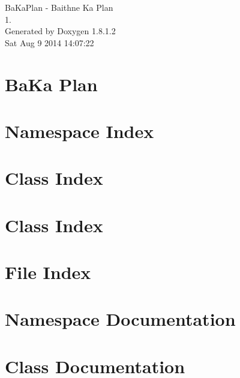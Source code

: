 \documentclass{book}
\begin{document}
\hypersetup{pageanchor=false,citecolor=blue}
\begin{titlepage}
\vspace*{7cm}
\begin{center}
{\Large Ba\-Ka\-Plan -\/ Baithne Ka Plan \\[1ex]\large 1. }\\
\vspace*{1cm}
{\large Generated by Doxygen 1.8.1.2}\\
\vspace*{0.5cm}
{\small Sat Aug 9 2014 14:07:22}\\
\end{center}
\end{titlepage}
\clearemptydoublepage
{}
\tableofcontents
\clearemptydoublepage
{}
\hypersetup{pageanchor=true,citecolor=blue}
\chapter{Ba\-Ka Plan}
\label{md_README}
\hypertarget{md_README}{}

\chapter{Namespace Index}

\chapter{Class Index}

\chapter{Class Index}

\chapter{File Index}

\chapter{Namespace Documentation}


\chapter{Class Documentation}




















\end{document}
